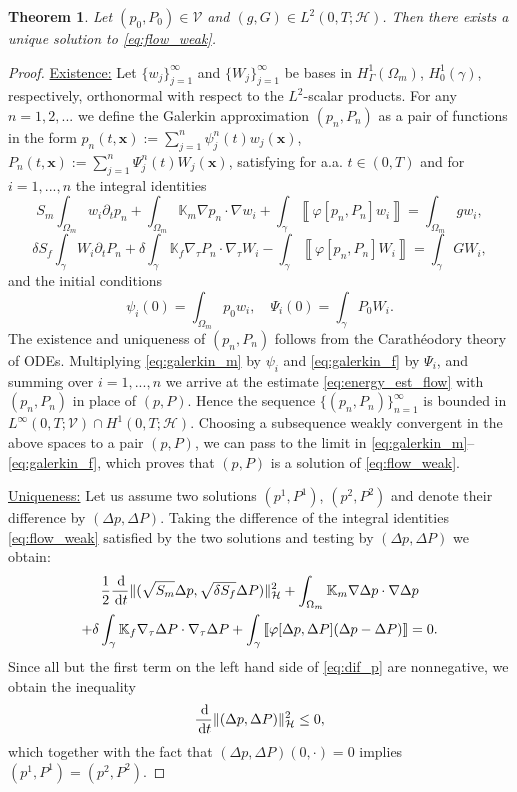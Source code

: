 \documentclass[a4paper]{article}
\newtheorem{theorem}{Theorem}
\def\d {\,{\rm d}}
\def\ddt#1{\frac{\d #1}{\d t}}
\def\dt{\prtl_t}
\def\Hf{\mathcal H}
\def\jmp#1{\left\llbracket #1 \right\rrbracket}
\def\norm#1{\|#1\|}
\def\pphi{{\varphi}}
\def\prtl{\partial}
\def\tn#1{{\mathbb{#1}}}    %
\def\Vf{{\mathcal V}} %
\def\vc#1{\mathbf{\boldsymbol{#1}}}     %
\def\xx{\vc x}
\newcommand{\eq}[1]{\begin{equation}#1\end{equation}}
\newcommand{\ml}[1]{\begin{multline}#1\end{multline}}
\begin{document}
\begin{theorem}
Let $(p_0,P_0)\in\Vf$ and $(g,G)\in L^2(0,T;\Hf)$.
Then there exists a unique solution to \eqref{eq:flow_weak}.
\end{theorem}
\begin{proof}
\underline{Existence:}
Let $\{w_j\}_{j=1}^\infty$ and $\{W_j\}_{j=1}^\infty$ be bases in $H^1_\Gamma(\Omega_m)$, $H^1_0(\gamma)$, respectively, orthonormal with respect to the $L^2$-scalar products.
For any $n=1,2,...$ we define the Galerkin approximation $(p_n,P_n)$ as a pair of functions in the form $p_n(t,\xx):=\sum_{j=1}^n\psi_j^n(t)w_j(\xx)$, $P_n(t,\xx):=\sum_{j=1}^n\Psi_j^n(t)W_j(\xx)$, satisfying for a.a. $t\in(0,T)$ and for $i=1,...,n$ the integral identities
\eq{ \label{eq:galerkin_m} S_m\int_{\Omega_m}w_i\dt p_n + \int_{\Omega_m}\tn K_m\nabla p_n\cdot\nabla w_i + \int_\gamma\jmp{\pphi[p_n,P_n]w_i} = \int_{\Omega_m}g w_i, }
\eq{ \label{eq:galerkin_f} \delta S_f\int_\gamma W_i\dt P_n + \delta\int_\gamma\tn K_f\nabla_\tau P_n\cdot\nabla_\tau W_i - \int_\gamma\jmp{\pphi[p_n,P_n]W_i} = \int_\gamma G W_i, }
and the initial conditions
\[ \psi_i(0)=\int_{\Omega_m}p_0w_i, \quad \Psi_i(0)=\int_\gamma P_0W_i. \]
The existence and uniqueness of $(p_n,P_n)$ follows from the Carath\'eodory theory of ODEs.
Multiplying \eqref{eq:galerkin_m} by $\psi_i$ and \eqref{eq:galerkin_f} by $\Psi_i$, and summing over $i=1,...,n$ we arrive at the estimate \eqref{eq:energy_est_flow} with $(p_n,P_n)$ in place of $(p,P)$.
Hence the sequence $\{(p_n,P_n)\}_{n=1}^\infty$ is bounded in $L^\infty(0,T;\Vf)\cap H^1(0,T;\Hf)$.
Choosing a subsequence weakly convergent in the above spaces to a pair $(p,P)$, we can pass to the limit in \eqref{eq:galerkin_m}--\eqref{eq:galerkin_f}, which proves that $(p,P)$ is a solution of \eqref{eq:flow_weak}.

\underline{Uniqueness:}
Let us assume two solutions $(p^1,P^1)$, $(p^2,P^2)$ and denote their difference by $(\Delta p,\Delta P)$.
Taking the difference of the integral identities \eqref{eq:flow_weak} satisfied by the two solutions and testing by $(\Delta p,\Delta P)$ we obtain:
\ml{ \label{eq:dif_p} \frac12\ddt{}\norm{(\sqrt{S_m}\Delta p,\sqrt{\delta S_f}\Delta P)}_\Hf^2
+ \int_{\Omega_m}\tn K_m\nabla\Delta p\cdot\nabla\Delta p\\
+ \delta\int_\gamma\tn K_f\nabla_\tau\Delta P\cdot\nabla_\tau\Delta P
+ \int_\gamma\jmp{\pphi[\Delta p,\Delta P](\Delta p-\Delta P)} = 0. }
Since all but the first term on the left hand side of \eqref{eq:dif_p} are nonnegative, we obtain the inequality
\eq{ \ddt{}\norm{(\Delta p,\Delta P)}_\Hf^2 \le 0, }
which together with the fact that $(\Delta p,\Delta P)(0,\cdot) = 0$ implies $(p^1,P^1)=(p^2,P^2)$.
\end{proof}
\end{document}
